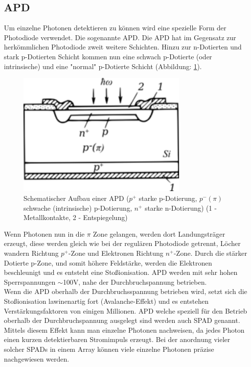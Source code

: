 \subsection{\acf{APD}}
Um einzelne Photonen detektieren zu können wird eine spezielle Form der Photodiode verwendet. Die sogenannte \ac{APD}. Die \ac{APD} hat im Gegensatz zur herkömmlichen Photodiode zweit weitere Schichten. Hinzu zur n-Dotierten und stark p-Dotierten Schicht kommen nun eine schwach p-Dotierte (oder intrinsische) und eine "normal" p-Dotierte Schicht (Abbildung: \ref{apd}). 
\begin{figure}[H]
	\centering
	\includegraphics[width=0.75\textwidth]{images/GrundlagenLaserentfernungsmessung/APD}
	\caption{Schematischer Aufbau einer \ac{APD} \cite{APD_Scematic} ($p^+$ starke p-Dotierung, $p^- (\pi)$ schwache (intrinsische) p-Dotierung, $n^+$ starke n-Dotierung) (1 - Metallkontakte, 2 - Entspiegelung)}
	\label{apd}
\end{figure}
Wenn Photonen nun in die $\pi$ Zone gelangen, werden dort Landungsträger erzeugt, diese werden gleich wie bei der regulären Photodiode getrennt, Löcher wandern Richtung $p^+$-Zone und Elektronen Richtung $n^+$-Zone. Durch die stärker Dotierte p-Zone, und somit höhere Feldstärke, werden die Elektronen beschleunigt und es entsteht eine Stoßionisation. \ac{APD} werden mit sehr hohen Sperrspannungen $\sim$100V, nahe der Durchbruchspannung betrieben. \cite{SPAD_mamamatsu} \\
Wenn die \ac{APD} oberhalb der Durchbruchsspannung betrieben wird, setzt sich die Stoßionisation lawinenartig fort (Avalanche-Effekt) und es entstehen Verstärkungsfaktoren von einigen Millionen. \ac{APD} welche speziell für den Betrieb oberhalb der Durchbruchspannung ausgelegt sind werden auch \ac{SPAD} genannt. Mittels diesem Effekt kann man einzelne Photonen nachweisen, da jedes Photon einen kurzen detektierbaren Stromimpuls erzeugt. Bei der anordnung vieler solcher \acp{SPAD} in einem Array können viele einzelne Photonen präzise nachgewiesen werden. \cite{SPAD_elmer}\\
